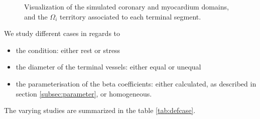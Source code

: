 \documentclass[a4paper, 11pt]{article} %
\begin{document}
\begin{figure}[hbtp]
\hspace{0.2cm}
\caption{Visualization of \protect{} the simulated coronary and myocardium domains, and \protect{} the $\Omega_i$ territory associated to each terminal segment.}
\label{fig:domlab}
\end{figure}


We study different cases in regards to
\begin{itemize}
\item the condition: either rest or stress
\item the diameter of the terminal vessels: either equal or unequal
\item the parameterisation of the beta coefficients: either calculated, as described in section \ref{subsec:parameter}, or homogeneous. 
\end{itemize}
The varying studies are summarized in the table \ref{tab:defcase}.
\end{document}
